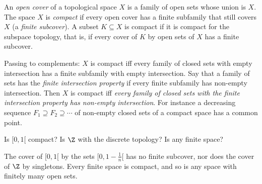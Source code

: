 \begin{definition}
An \emph{open cover} of a topological space $X$ is a family of open sets whose union is $X$. The space $X$ is \emph{compact} if every open cover
has a finite subfamily that still covers $X$ (a \emph{finite subcover}). A subset $K\subseteq X$ is compact if it is compact for the subspace
topology, that is, if every cover of $K$ by open sets of $X$ has a finite subcover.
\end{definition}

Passing to complements: $X$ is compact iff every family of closed sets with empty intersection has a finite subfamily with
empty intersection. Say that a family of sets has the \emph{finite intersection property} if every finite subfamily has non-empty
intersection. Then $X$ is compact iff \emph{every family of closed sets with the finite intersection property has non-empty
intersection}. For instance a decreasing sequence $F_1\supseteq F_2\supseteq\cdots$ of non-empty closed sets of a compact space has a common point.

\begin{think}
Is $[0,1[$ compact? Is $\Z$ with the discrete topology? Is any finite space?
\end{think}

The cover of $[0,1[$ by the sets $[0,1-\frac1n[$ has no finite subcover, nor does the cover of $\Z$ by singletons. Every finite space is compact, and
so is any space with finitely many open sets.

